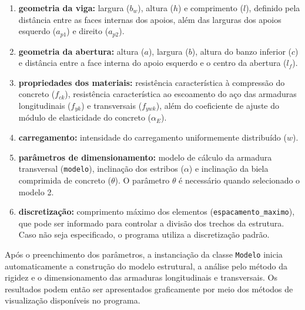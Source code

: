 \begin{enumerate}[label=\alph*)]

\item \textbf{geometria da viga:} largura ($b_w$), altura ($h$) e comprimento ($l$), definido pela distância entre as faces internas dos apoios, além das larguras dos apoios esquerdo ($a_{p1}$) e direito ($a_{p2}$).

\item \textbf{geometria da abertura:} altura ($a$), largura ($b$), altura do banzo inferior ($c$) e distância entre a face interna do apoio esquerdo e o centro da abertura ($l_f$).

\item \textbf{propriedades dos materiais:} resistência característica à compressão do concreto ($f_{ck}$), resistência característica ao escoamento do aço das armaduras longitudinais ($f_{yk}$) e transversais ($f_{ywk}$), além do coeficiente de ajuste do módulo de elasticidade do concreto ($\alpha_E$).

\item \textbf{carregamento:} intensidade do carregamento uniformemente distribuído ($w$).

\item \textbf{parâmetros de dimensionamento:} modelo de cálculo da armadura transversal (\texttt{modelo}), inclinação dos estribos ($\alpha$) e inclinação da biela comprimida de concreto ($\theta$). O parâmetro $\theta$ é necessário quando selecionado o modelo 2.

\item \textbf{discretização:} comprimento máximo dos elementos (\texttt{espacamento\_maximo}), que pode ser informado para controlar a divisão dos trechos da estrutura. Caso não seja especificado, o programa utiliza a discretização padrão.

\end{enumerate}

Após o preenchimento dos parâmetros, a instanciação da classe \texttt{Modelo} inicia automaticamente a construção do modelo estrutural, a análise pelo método da rigidez e o dimensionamento das armaduras longitudinais e transversais. Os resultados podem então ser apresentados graficamente por meio dos métodos de visualização disponíveis no programa.



